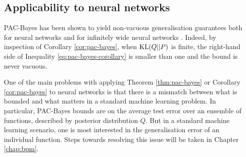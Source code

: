 \begin{refsection}
\subsection{Applicability to neural networks}

PAC-Bayes has been shown to yield non-vacuous generalisation guarantees both for neural networks \citep{DR17} and for infinitely wide neural networks \citep{Prez2020GeneralizationBF,my-bpm}. Indeed, by inspection of Corollary \ref{cor:pac-bayes}, when $\mathrm{KL}(Q||P)$ is finite, the right-hand side of Inequality \ref{eq:pac-bayes-corollary} is smaller than one and the bound is never vacuous.

One of the main problems with applying Theorem \ref{thm:pac-bayes} or Corollary \ref{cor:pac-bayes} to neural networks is that there is a mismatch between what is bounded and what matters in a standard machine learning problem. In particular, PAC-Bayes bounds are on the average test error over an ensemble of functions, described by posterior distribution $Q$. But in a standard machine learning scenario, one is most interested in the generalisation error of an individual function. Steps towards resolving this issue will be taken in Chapter \ref{chap:bpm}.

\printbibliography[heading=subbibliography]
\end{refsection}